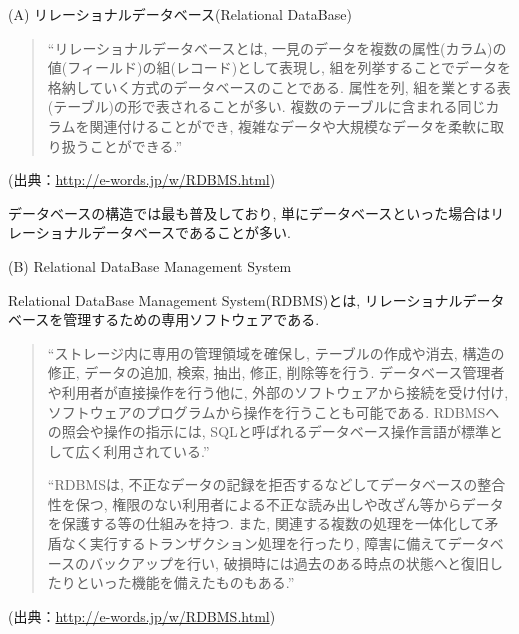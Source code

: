 \begin{description}
\item (A) リレーショナルデータベース(Relational DataBase)

\begin{quotation}
\begin{screen}
“リレーショナルデータベースとは, 一見のデータを複数の属性(カラム)の値(フィールド)の組(レコード)として表現し, 組を列挙することでデータを格納していく方式のデータベースのことである.
属性を列, 組を業とする表(テーブル)の形で表されることが多い.
複数のテーブルに含まれる同じカラムを関連付けることができ, 複雑なデータや大規模なデータを柔軟に取り扱うことができる.”
\end{screen}
\end{quotation}
\begin{flushright}
(出典：\url{http://e-words.jp/w/RDBMS.html})
\end{flushright}

データベースの構造では最も普及しており, 単にデータベースといった場合はリレーショナルデータベースであることが多い.

\item (B) Relational DataBase Management System

Relational DataBase Management System(RDBMS)とは, リレーショナルデータベースを管理するための専用ソフトウェアである.

\begin{quotation}
\begin{screen}
“ストレージ内に専用の管理領域を確保し, テーブルの作成や消去, 構造の修正, データの追加, 検索, 抽出, 修正, 削除等を行う.
データベース管理者や利用者が直接操作を行う他に, 外部のソフトウェアから接続を受け付け, ソフトウェアのプログラムから操作を行うことも可能である.
RDBMSへの照会や操作の指示には, SQLと呼ばれるデータベース操作言語が標準として広く利用されている.”

“RDBMSは, 不正なデータの記録を拒否するなどしてデータベースの整合性を保つ, 権限のない利用者による不正な読み出しや改ざん等からデータを保護する等の仕組みを持つ.
また, 関連する複数の処理を一体化して矛盾なく実行するトランザクション処理を行ったり, 障害に備えてデータベースのバックアップを行い, 破損時には過去のある時点の状態へと復旧したりといった機能を備えたものもある.”
\end{screen}
\end{quotation}
\begin{flushright}
(出典：\url{http://e-words.jp/w/RDBMS.html})
\end{flushright}

\end{description}

